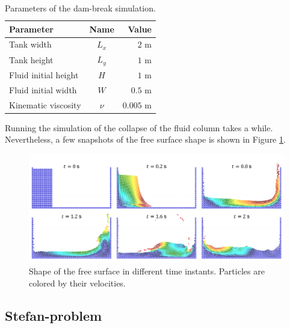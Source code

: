 \documentclass[a4paper,12pt,openany]{book}
\theoremstyle{break}
\begin{document}
\begin{table} [H]
\begin{center}
\caption{Parameters of the dam-break simulation.}\label{tbl:dam_break_params}
\begin{tabular}{ l c r }
\toprule[1.5pt]
\bf Parameter & \bf Name & \bf Value \\
\midrule
Tank width & $L_x$ & $2$ m \\
Tank height & $L_y$ & $1$ m \\
Fluid initial height & $H$ & $1$ m \\
Fluid initial width & $W$ & $0.5$ m \\
Kinematic viscosity & $\nu$ & $0.005$ m \\
\bottomrule[1.25pt]
\end{tabular}
\end{center}
\end{table}
Running the simulation of the collapse of the fluid column takes a while. Nevertheless, a few snapshots of the free surface shape is shown in Figure \ref{fig:dam_break_results}. 
\begin{figure}[H]
  \includegraphics[scale=0.5]{dam_break_result.pdf}
  \centering
  \caption{Shape of the free surface in different time instants. Particles are colored by their velocities. }
  \label{fig:dam_break_results}
\end{figure}\vspace*{3pt}


\subsection{Stefan-problem}
\end{document}
